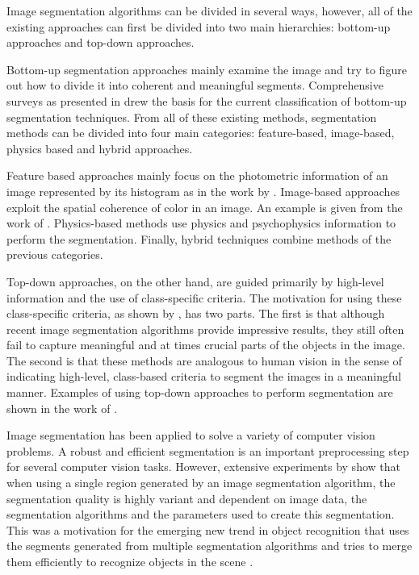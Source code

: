 \documentclass[10pt,twocolumn,letterpaper]{article}
\begin{document}
Image segmentation algorithms can be divided in several ways, however,
all of the existing approaches can first be divided into two main
hierarchies: bottom-up approaches and top-down approaches.

Bottom-up segmentation approaches mainly examine the image and try to
figure out how to divide it into coherent and meaningful segments.
Comprehensive surveys as presented in \cite{Yz_colorimage,Cheng01colorimage}
drew the basis for the current classification of bottom-up segmentation
techniques. From all of these existing methods, segmentation methods can
be divided into four main categories: feature-based, image-based,
physics based and hybrid approaches.

Feature based approaches mainly focus on the photometric information of
an image represented by its histogram as in the work by
\cite{1059188,Yang07unsupervisedsegmentation}. Image-based approaches
exploit the spatial coherence of color in an image. An example is given
from the work of \cite{649319}. Physics-based methods use physics and
psychophysics information to perform the segmentation. Finally, hybrid
techniques combine methods of the previous categories.

Top-down approaches, on the other hand, are guided primarily by high-level
information and the use of class-specific criteria. The motivation for
using these class-specific criteria, as shown by \cite{649285}, has two
parts. The first is that although recent image segmentation algorithms
provide impressive results, they still often fail to capture meaningful
and at times crucial parts of the objects in the image. The second is that
these methods are analogous to human vision in the sense of indicating
high-level, class-based criteria to segment the images in a meaningful
manner. Examples of using top-down approaches to perform segmentation are
shown in the work of \cite{649285,Leibe04combinedobject,1097721}.

Image segmentation has been applied to solve a variety of computer vision problems.
A robust and efficient segmentation is an important preprocessing step for several
computer vision tasks. However, extensive experiments by \cite{Unnikrishnan_2007_5789}
show that when using a single region generated by an image segmentation
algorithm, the segmentation quality is highly variant and dependent on image
data, the segmentation algorithms and the parameters used to create this
segmentation. This was a motivation for the emerging new trend in object
recognition that uses the segments generated from multiple segmentation
algorithms and tries to merge them efficiently to recognize objects in the
scene \cite{Efros_2006_5395,PSH08,malisiewicz-bmvc07}.
\end{document}

